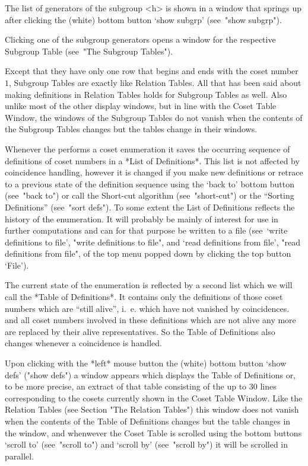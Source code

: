The list of generators of the subgroup <h> is shown in a window that
springs up after clicking the (white) bottom button `show subgrp'
(see~"show subgrp").

Clicking one of the subgroup generators opens a window for the
respective Subgroup Table (see~"The Subgroup Tables").



Except that they have only one row that begins and ends with the coset
number $1$, Subgroup Tables are exactly like Relation Tables. All
that has been said about making definitions in Relation Tables holds
for Subgroup Tables as well.
Also unlike most of the other display windows, but in line with the Coset
Table Window, the windows of the Subgroup Tables do not vanish when the
contents of the Subgroup Tables changes
but the tables change in their windows.




Whenever the {\ITC} performs a coset enumeration it saves the occurring
sequence of definitions of coset numbers in a *List of Definitions*.
This list is not affected by coincidence handling, however it is
changed if you make new definitions or retrace to a previous state of
the definition sequence using the `back to' bottom button (see~"back
to") or call the Short-cut algorithm (see~"short-cut") or the ``Sorting
Definitions'' (see~"sort defs"). To some extent the List of Definitions
reflects the history of the enumeration. It will probably be mainly of
interest for use in further computations and can for that purpose be
written to a file (see~`write definitions to file', "write definitions
to file", and `read definitions from file', "read definitions from
file", of the top menu popped down by clicking the top button `File').

The current state of the enumeration is reflected by a second list
which we will call the *Table of Definitions*. It contains only the
definitions of those coset numbers which are ``still alive'', i.~e. which
have not vanished by coincidences. and all coset numbers involved in
these definitions which are not alive any more are replaced by their
alive representatives. So the Table of Definitions also changes
whenever a coincidence is handled.

Upon clicking with the *left* mouse button the (white) bottom button
`show defs' ("show defs") a window appears which displays the Table
of Definitions or, to be more precise, an extract of that table
consisting of the up to 30 lines corresponding to the cosets
currently shown in the Coset Table Window. Like the Relation Tables
(see Section "The Relation Tables") this window does not vanish when
the contents of the Table of Definitions changes but the table changes
in the window, and whenwever the Coset Table is scrolled using the
bottom buttons `scroll to' (see~"scroll to") and `scroll by'
(see~"scroll by") it will be scrolled in parallel.

